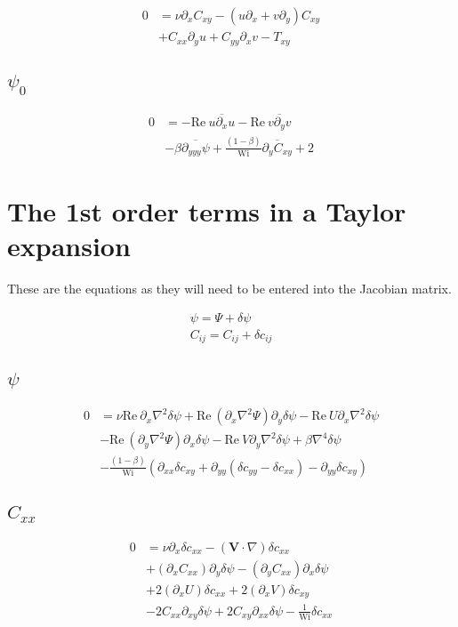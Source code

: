 \documentclass[12,a4paper]{article}
\newcommand{\dd}[1]{\partial_{#1}}
\newcommand{\lpl}{\nabla^{2}}
\newcommand{\bih}{\nabla^{4}}
\newcommand{\scij}{\delta c_{ij}}
\newcommand{\scxx}{\delta c_{xx}}
\newcommand{\scyy}{\delta c_{yy}}
\newcommand{\scxy}{\delta c_{xy}}
\newcommand{\spsi}{\delta \psi}
\newcommand{\Wi}{\mathrm{Wi}}
\newcommand{\Rey}{\mathrm{Re \ }}
\begin{document}
\begin{align}
    0 &= \nu \dd{x} C_{xy} - (u\dd{x} + v\dd{y}) C_{xy} \nonumber\\
    &+ C_{xx} \dd{y}u + C_{yy}\dd{x}v - T_{xy}
\end{align}

\subsection{$\psi_{0}$}

\begin{align}
    0 &= - \Rey \overline{u\dd{x}u} - \Rey \overline{v\dd{y}v} \nonumber\\
    &- \beta \overline{\dd{yyy}\psi} + \frac{(1-\beta)}{\Wi}\overline{\dd{y}C_{xy}} + 2
\end{align}

\section{The 1st order terms in a Taylor expansion}

These are the equations as they will need to be entered into the Jacobian matrix.

\begin{align}
\psi = \Psi + \spsi \\
C_{ij} = C_{ij} +\scij
\end{align}

\subsection{$\psi$}

\begin{align}
    0 &= \nu\Rey\dd{x}\lpl\spsi +  \Rey (\dd{x}\lpl\Psi) \dd{y}\spsi - \Rey U \dd{x}\lpl \spsi \nonumber\\
    &- \Rey (\dd{y}\lpl \Psi) \dd{x} \spsi - \Rey V \dd{y} \lpl \spsi + \beta \bih \spsi \nonumber\\
    &- \frac{(1-\beta)}{\Wi} \left( \dd{xx} \scxy +\dd{yy} (\scyy -\scxx) - \dd{yy} \scxy \right)
\end{align}

\subsection{$C_{xx}$}

\begin{align}
    0 &= \nu \dd{x} \scxx - (\mathbf{V}\cdot \nabla) \scxx \nonumber \\
    &+ (\dd{x}C_{xx})\dd{y}\spsi - (\dd{y}C_{xx})\dd{x} \spsi \nonumber\\
    &+ 2(\dd{x} U) \scxx + 2(\dd{x} V) \scxy \nonumber\\
    &- 2C_{xx}\dd{xy} \spsi + 2C_{xy}\dd{xx}\spsi - \frac{1}{\Wi}\scxx
\end{align}
\end{document}

